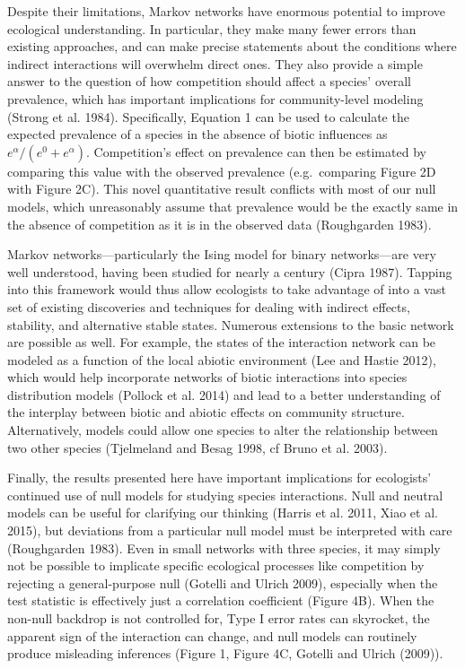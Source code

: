 \documentclass[12pt,]{article}
\begin{document}
\begin{spacing}{1.9}
\begin{flushleft}
Despite their limitations, Markov networks have enormous potential to
improve ecological understanding. In particular, they make many fewer
errors than existing approaches, and can make precise statements about
the conditions where indirect interactions will overwhelm direct ones.
They also provide a simple answer to the question of how competition
should affect a species' overall prevalence, which has important
implications for community-level modeling (Strong et al. 1984).
Specifically, Equation 1 can be used to calculate the expected
prevalence of a species in the absence of biotic influences as
\(e^\alpha/(e^{0} + e^\alpha)\). Competition's effect on prevalence can
then be estimated by comparing this value with the observed prevalence
(e.g.~comparing Figure 2D with Figure 2C). This novel quantitative
result conflicts with most of our null models, which unreasonably assume
that prevalence would be the exactly same in the absence of competition
as it is in the observed data (Roughgarden 1983).

Markov networks---particularly the Ising model for binary networks---are
very well understood, having been studied for nearly a century (Cipra
1987). Tapping into this framework would thus allow ecologists to take
advantage of into a vast set of existing discoveries and techniques for
dealing with indirect effects, stability, and alternative stable states.
Numerous extensions to the basic network are possible as well. For
example, the states of the interaction network can be modeled as a
function of the local abiotic environment (Lee and Hastie 2012), which
would help incorporate networks of biotic interactions into species
distribution models (Pollock et al. 2014) and lead to a better
understanding of the interplay between biotic and abiotic effects on
community structure. Alternatively, models could allow one species to
alter the relationship between two other species (Tjelmeland and Besag
1998, cf Bruno et al. 2003).

Finally, the results presented here have important implications for
ecologists' continued use of null models for studying species
interactions. Null and neutral models can be useful for clarifying our
thinking (Harris et al. 2011, Xiao et al. 2015), but deviations from a
particular null model must be interpreted with care (Roughgarden 1983).
Even in small networks with three species, it may simply not be possible
to implicate specific ecological processes like competition by rejecting
a general-purpose null (Gotelli and Ulrich 2009), especially when the
test statistic is effectively just a correlation coefficient (Figure
4B). When the non-null backdrop is not controlled for, Type I error
rates can skyrocket, the apparent sign of the interaction can change,
and null models can routinely produce misleading inferences (Figure 1,
Figure 4C, Gotelli and Ulrich (2009)).


\end{flushleft}
\end{spacing}
\end{document}
